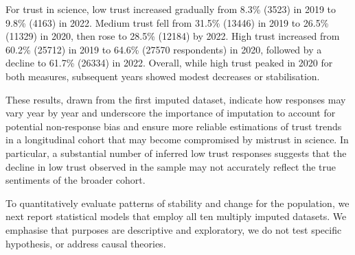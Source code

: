 \documentclass[
  single column]{article}
\begin{document}
For trust in science, low trust increased gradually from 8.3\% (3523) in
2019 to 9.8\% (4163) in 2022. Medium trust fell from 31.5\% (13446) in
2019 to 26.5\% (11329) in 2020, then rose to 28.5\% (12184) by 2022.
High trust increased from 60.2\% (25712) in 2019 to 64.6\% (27570
respondents) in 2020, followed by a decline to 61.7\% (26334) in 2022.
Overall, while high trust peaked in 2020 for both measures, subsequent
years showed modest decreases or stabilisation.

These results, drawn from the first imputed dataset, indicate how
responses may vary year by year and underscore the importance of
imputation to account for potential non-response bias and ensure more
reliable estimations of trust trends in a longitudinal cohort that may
become compromised by mistrust in science. In particular, a substantial
number of inferred low trust responses suggests that the decline in low
trust observed in the sample may not accurately reflect the true
sentiments of the broader cohort.

To quantitatively evaluate patterns of stability and change for the
population, we next report statistical models that employ all ten
multiply imputed datasets. We emphasise that purposes are descriptive
and exploratory, we do not test specific hypothesis, or address causal
theories.
\end{document}

